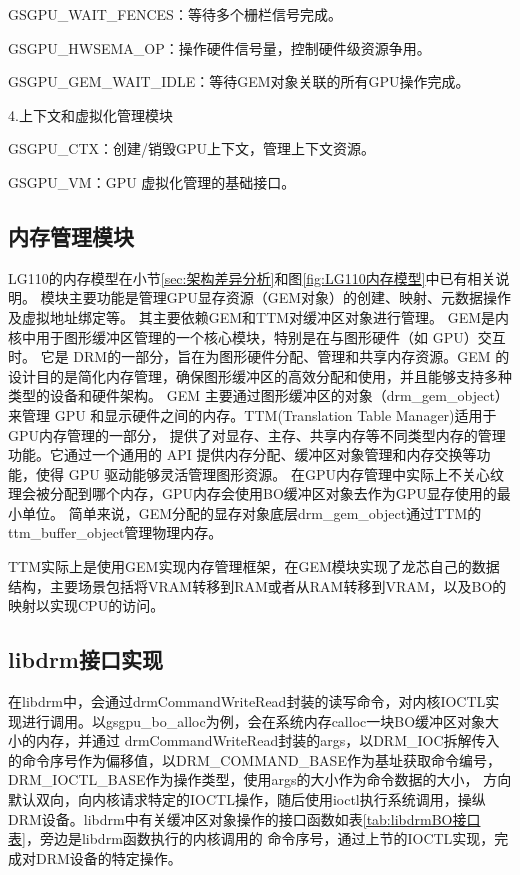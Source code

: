 GSGPU\_WAIT\_FENCES：等待多个栅栏信号完成。

GSGPU\_HWSEMA\_OP：操作硬件信号量，控制硬件级资源争用。

GSGPU\_GEM\_WAIT\_IDLE：等待GEM对象关联的所有GPU操作完成。

4.上下文和虚拟化管理模块

GSGPU\_CTX：创建/销毁GPU上下文，管理上下文资源。

GSGPU\_VM：GPU 虚拟化管理的基础接口。

\subsection{内存管理模块}
LG110的内存模型在小节\ref{sec:架构差异分析}和图\ref{fig:LG110内存模型}中已有相关说明。
模块主要功能是管理GPU显存资源（GEM对象）的创建、映射、元数据操作及虚拟地址绑定等。
其主要依赖GEM和TTM对缓冲区对象进行管理。
GEM是内核中用于图形缓冲区管理的一个核心模块，特别是在与图形硬件（如 GPU）交互时。
它是 DRM的一部分，旨在为图形硬件分配、管理和共享内存资源。GEM 的设计目的是简化内存管理，确保图形缓冲区的高效分配和使用，并且能够支持多种类型的设备和硬件架构。
GEM 主要通过图形缓冲区的对象（drm\_gem\_object）来管理 GPU 和显示硬件之间的内存。TTM(Translation Table Manager)适用于GPU内存管理的一部分，
提供了对显存、主存、共享内存等不同类型内存的管理功能。它通过一个通用的 API 提供内存分配、缓冲区对象管理和内存交换等功能，使得 GPU 驱动能够灵活管理图形资源。
在GPU内存管理中实际上不关心纹理会被分配到哪个内存，GPU内存会使用BO缓冲区对象去作为GPU显存使用的最小单位。
简单来说，GEM分配的显存对象底层drm\_gem\_object通过TTM的ttm\_buffer\_object管理物理内存。

TTM实际上是使用GEM实现内存管理框架，在GEM模块实现了龙芯自己的数据结构，主要场景包括将VRAM转移到RAM或者从RAM转移到VRAM，以及BO的映射以实现CPU的访问。



\subsection{libdrm接口实现}
在libdrm中，会通过drmCommandWriteRead封装的读写命令，对内核IOCTL实现进行调用。以gsgpu\_bo\_alloc为例，会在系统内存calloc一块BO缓冲区对象大小的内存，并通过
drmCommandWriteRead封装的args，以DRM\_IOC拆解传入的命令序号作为偏移值，以DRM\_COMMAND\_BASE作为基址获取命令编号，DRM\_IOCTL\_BASE作为操作类型，使用args的大小作为命令数据的大小，
方向默认双向，向内核请求特定的IOCTL操作，随后使用ioctl执行系统调用，操纵DRM设备。libdrm中有关缓冲区对象操作的接口函数如表\ref{tab:libdrmBO接口表}，旁边是libdrm函数执行的内核调用的
命令序号，通过上节的IOCTL实现，完成对DRM设备的特定操作。

